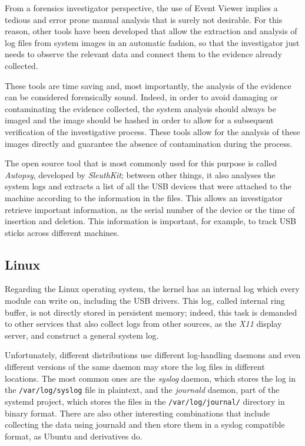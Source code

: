 \documentclass[a4paper]{article}
\begin{document}
From a forensics investigator perspective, the use of Event Viewer implies a
tedious and error prone manual analysis that is surely not desirable. For this
reason, other tools have been developed that allow the extraction and analysis
of log files from system images in an automatic fashion, so that the
investigator just needs to observe the relevant data and connect them to the
evidence already collected.

These tools are time saving and, most importantly, the analysis of the evidence
can be considered forensically sound. Indeed, in order to avoid damaging or
contaminating the evidence collected, the system analysis should always be
imaged and the image should be hashed in order to allow for a subsequent
verification of the investigative process. These tools allow for the analysis of
these images directly and guarantee the absence of contamination during the
process.~\cite{murphey2007automated}

The open source tool that is most commonly used for this purpose is called
\emph{Autopsy}, developed by \emph{SleuthKit}; between other things, it also
analyses the system logs and extracts a list of all the USB devices that were
attached to the machine according to the information in the files. This allows
an investigator retrieve important information, as the serial number of the
device or the time of insertion and deletion. This information is important, for
example, to track USB sticks across different machines.~\cite{deb2015usb}

\subsection{Linux}
Regarding the Linux operating system, the kernel has an internal log which every
module can write on, including the USB drivers. This log, called internal ring
buffer, is not directly stored in persistent memory; indeed, this task is
demanded to other services that also collect logs from other sources, as the
\emph{X11} display server, and construct a general system log.

Unfortunately, different distributions use different log-handling daemons and
even different versions of the same daemon may store the log files in
different locations. The most common ones are the \emph{syslog} daemon, which
stores the log in the \texttt{/var/log/syslog} file in plaintext, and the
\emph{journald} daemon, part of the systemd project, which stores the files in
the \texttt{/var/log/journal/} directory in binary format. There are also other
interesting combinations that include collecting the data using journald and
then store them in a syslog compatible format, as Ubuntu and derivatives
do.~\cite{poettering2012journal}
\end{document}
